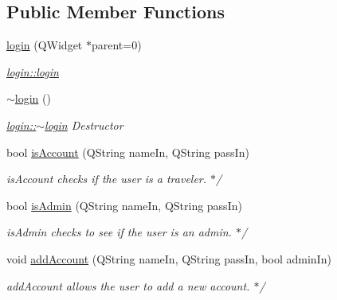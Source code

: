\subsection*{Public Member Functions}
\begin{DoxyCompactItemize}
\item 
\mbox{\hyperlink{classlogin_a4bea95f394a7f5709d79b13455881602}{login}} (Q\+Widget $\ast$parent=0)
\begin{DoxyCompactList}\small\item\em \mbox{\hyperlink{classlogin_a4bea95f394a7f5709d79b13455881602}{login\+::login}} \end{DoxyCompactList}\item 
\mbox{\label{classlogin_a4086fe44ad1e40447a0bebbc9b8b3c14}} 
\mbox{\hyperlink{classlogin_a4086fe44ad1e40447a0bebbc9b8b3c14}{$\sim$login}} ()
\begin{DoxyCompactList}\small\item\em \mbox{\hyperlink{classlogin_a4086fe44ad1e40447a0bebbc9b8b3c14}{login\+::$\sim$login}} Destructor \end{DoxyCompactList}\item 
\mbox{\label{classlogin_adcc8c00bf61ba4cc79454cea09cb97e1}} 
bool \mbox{\hyperlink{classlogin_adcc8c00bf61ba4cc79454cea09cb97e1}{is\+Account}} (Q\+String name\+In, Q\+String pass\+In)
\begin{DoxyCompactList}\small\item\em is\+Account checks if the user is a traveler. $\ast$/ \end{DoxyCompactList}\item 
\mbox{\label{classlogin_ab004af3250f9dc29d1e9a9448c3bba27}} 
bool \mbox{\hyperlink{classlogin_ab004af3250f9dc29d1e9a9448c3bba27}{is\+Admin}} (Q\+String name\+In, Q\+String pass\+In)
\begin{DoxyCompactList}\small\item\em is\+Admin checks to see if the user is an admin. $\ast$/ \end{DoxyCompactList}\item 
\mbox{\label{classlogin_ae57494ecbbb2ad9f0fdec03ce65af336}} 
void \mbox{\hyperlink{classlogin_ae57494ecbbb2ad9f0fdec03ce65af336}{add\+Account}} (Q\+String name\+In, Q\+String pass\+In, bool admin\+In)
\begin{DoxyCompactList}\small\item\em add\+Account allows the user to add a new account. $\ast$/ \end{DoxyCompactList}\end{DoxyCompactItemize}


